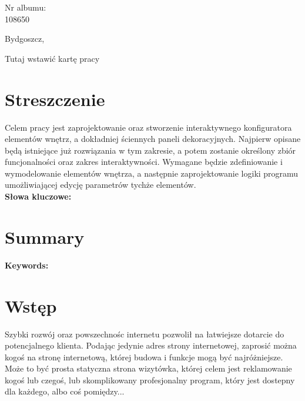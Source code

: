 \documentclass{article} %
\begin{document}
\begin{minipage}{2in}
Nr albumu: \\
108650
\end{minipage}

\begin{center}
 Bydgoszcz,
\end{center}


\newpage

\hspace{0pt}
\vfill

\begin{center}
\Huge Tutaj wstawić kartę pracy
\end{center}

\vfill
\hspace{0pt}

\newpage

\section*{Streszczenie}
Celem pracy jest zaprojektowanie oraz stworzenie interaktywnego konfiguratora elementów wnętrz, a dokładniej ściennych paneli dekoracyjnych. Najpierw opisane będą istniejące już rozwiązania w tym zakresie, a potem zostanie określony zbiór funcjonalności oraz zakres interaktywności. Wymagane będzie zdefiniowanie i wymodelowanie elementów wnętrza, a następnie zaprojektowanie logiki programu umożliwiającej edycję parametrów tychże elementów.
\\

\textbf{Słowa kluczowe:}

\section*{Summary}

\textbf{Keywords:}

\newpage

\tableofcontents

\newpage

\section{Wstęp}


Szybki rozwój oraz powszechnośc internetu pozwolił na łatwiejsze dotarcie do potencjalnego klienta. Podając jedynie adres strony internetowej, zaprosić można kogoś na stronę internetową, której budowa i funkcje mogą być najróżniejsze. Może to być prosta statyczna strona wizytówka, której celem jest reklamowanie kogoś lub czegoś, lub skomplikowany profesjonalny program, który jest dostepny dla każdego, albo coś pomiędzy...
\\
\end{document}
